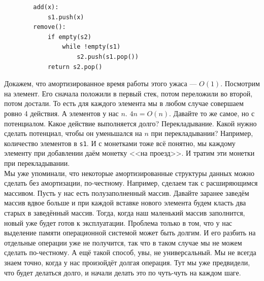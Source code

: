\documentclass{article}
\newcommand{\pseudo}{PseudoLexer.py:PseudoLexer -x}
\newcommand{\pseudocode}[1]{\texttt{#1}}
\begin{document}
    \begin{verbatim}
        add(x):
            s1.push(x)
        remove():
            if empty(s2)
                while !empty(s1)
                    s2.push(s1.pop())
            return s2.pop()
    \end{verbatim}
    Докажем, что амортизированное время работы этого ужаса --- $O(1)$. Посмотрим на элемент. Его сначала положили в первый стек, потом переложили во второй, потом достали. То есть для каждого элемента мы в любом случае совершаем ровно 4 действия. А элементов у нас $n$. $4n=O(n)$.
    Давайте то же самое, но с потенциалом. Какое действие выполняется долго? Перекладывание. Какой нужно сделать потенциал, чтобы он уменьшался на $n$ при перекладывании? Например, количество элементов в \pseudocode{s1}. И с монетками тоже всё понятно, мы каждому элементу при добавлении даём монетку <<на проезд>>. И тратим эти монетки при перекладывании.\\
    Мы уже упоминали, что некоторые амортизированные структуры данных можно сделать без амортизации, по-честному. Например, сделаем так с расширяющимся массивом. Пусть у нас есть полузаполненный массив. Давайте заранее заведём массив вдвое больше и при каждой вставке нового элемента будем класть два старых в заведённый массив. Тогда, когда наш маленький массив заполнится, новый уже будет готов к эксплуатации. Проблема только в том, что у нас выделение памяти операционной системой может быть долгим. И его разбить на отдельные операции уже не получится, так что в таком случае мы не можем сделать по-честному. А ещё такой способ, увы, не универсальный. Мы не всегда знаем точно, когда у нас произойдёт долгая операция. Тут мы уже предвидели, что будет делаться долго, и начали делать это по чуть-чуть на каждом шаге.
\end{document}

